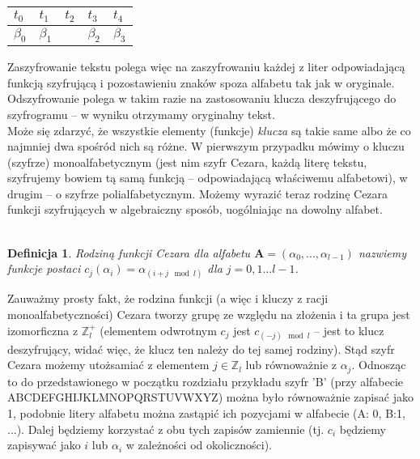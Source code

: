 \documentclass[a4paper]{article}
\theoremstyle{defn}
\newtheorem{defn}{Definicja}[subsection]
\theoremstyle{theorem}
\theoremstyle{lemma}
\theoremstyle{cor}
\theoremstyle{fact}
\begin{document}
\begin{center}\begin{tabular}{|p{1.5mm}|p{1.5mm}|p{1.5mm}|p{1.5mm}|p{1.5mm}|}
    $t_0$ & $t_1$ & $t_2$ & $t_3$ & $t_4$ \\ \hline
    $\beta_0$ & $\beta_1$ & & $\beta_2$ & $\beta_3$
\end{tabular}
\end{center}
Zaszyfrowanie tekstu polega więc na zaszyfrowaniu każdej z liter odpowiadającą funkcją szyfrującą i pozostawieniu znaków spoza alfabetu tak jak w oryginale. Odszyfrowanie polega w takim razie na zastosowaniu klucza deszyfrującego do szyfrogramu – w wyniku otrzymamy oryginalny tekst.\\
Może się zdarzyć, że wszystkie elementy (funkcje) \textit{klucza} są takie same albo że co najmniej dwa spośród nich są różne. W pierwszym przypadku mówimy o kluczu (szyfrze) monoalfabetycznym (jest nim szyfr Cezara, każdą literę tekstu, szyfrujemy bowiem tą samą funkcją – odpowiadającą właściwemu alfabetowi), w drugim – o szyfrze polialfabetycznym.
Możemy wyrazić teraz rodzinę Cezara funkcji szyfrujących w algebraiczny sposób, uogólniając na dowolny alfabet.\\\\
\begin{defn}\label{defn4.1.5}
Rodziną funkcji Cezara dla alfabetu $\boldsymbol{A} = (\alpha_0, ..., \alpha_{l-1})$ nazwiemy funkcje postaci $c_j(\alpha_i) = \alpha_{(i+j \mod l)}$ dla $j = 0,1...l-1$.
\end{defn}
Zauważmy prosty fakt, że rodzina funkcji (a więc i kluczy z racji monoalfabetyczności) Cezara tworzy grupę ze względu na złożenia i ta grupa jest izomorficzna z $\mathbb{Z}_l^+$ (elementem odwrotnym $c_{j}$ jest $c_{(-j) \mod l}$ – jest to klucz deszyfrujący, widać więc, że klucz ten należy do tej samej rodziny). Stąd szyfr Cezara możemy utożsamiać z elementem $j \in \mathbb{Z}_l$ lub równoważnie z $\alpha_j$. Odnosząc to do przedstawionego w początku rozdziału przykładu szyfr 'B' (przy alfabecie ABCDEFGHIJKLMNOPQRSTUVWXYZ) można było równoważnie zapisać jako 1, podobnie litery alfabetu można zastąpić ich pozycjami w alfabecie (A: 0, B:1, ...).  Dalej będziemy korzystać z obu tych zapisów zamiennie (tj. $c_i$ będziemy zapisywać jako $i$ lub $\alpha_i$ w zależności od okoliczności).\\
\end{document}
